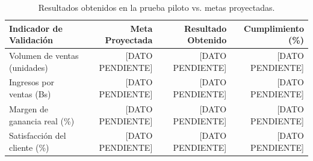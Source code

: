 \begin{table}[htbp]
    \centering
    \caption{Resultados obtenidos en la prueba piloto vs. metas proyectadas.}
    \label{tab:resultados_piloto}
    \begin{tabular}{lrrr}
        \toprule
        \textbf{Indicador de Validación} & \textbf{Meta Proyectada} & \textbf{Resultado Obtenido} & \textbf{Cumplimiento (\%)} \\
        \midrule
        Volumen de ventas (unidades)    & [DATO PENDIENTE] & [DATO PENDIENTE] & [DATO PENDIENTE] \\
        Ingresos por ventas (Bs)        & [DATO PENDIENTE] & [DATO PENDIENTE] & [DATO PENDIENTE] \\
        Margen de ganancia real (\%)    & [DATO PENDIENTE] & [DATO PENDIENTE] & [DATO PENDIENTE] \\
        Satisfacción del cliente (\%)   & [DATO PENDIENTE] & [DATO PENDIENTE] & [DATO PENDIENTE] \\
        \bottomrule
    \end{tabular}
\end{table}
